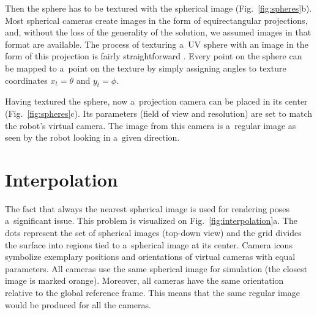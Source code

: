 \documentclass{svproc}
\begin{document}
Then the sphere has to be textured with the spherical image (Fig.~\ref{fig:spheres}b).
Most spherical cameras create images in the form of equirectangular projections, and, without the loss
of the generality of the solution, we assumed images in that format are available.
The process of texturing a~UV sphere with an image in the form of this projection is fairly straightforward \cite{greene1986environment}. 
Every point on the sphere can be mapped to a~point on the texture by simply assigning angles to texture 
coordinates $x_t = \theta$ and $y_t = \phi$.

Having textured the sphere, now a~projection camera can be placed in its center (Fig.~\ref{fig:spheres}c).
Its parameters (field of view and resolution) are set to match the robot's virtual camera.
The image from this camera is a~regular image as seen by the robot looking in a~given direction.

\section{Interpolation}
\label{sec:iterpolate}


The fact that always the nearest spherical image is used for rendering poses a~significant issue.
This problem is visualized on Fig.~\ref{fig:interpolation}a.
The dots represent the set of spherical images (top-down view) and the grid divides the surface into regions tied to a~spherical image at its center.
Camera icons symbolize exemplary positions and orientations of virtual cameras with equal parameters.
All cameras use the same spherical image for simulation (the closest image is marked orange).
Moreover, all cameras have the same orientation relative to the global reference frame.
This means that the same regular image would be produced for all the cameras.
\end{document}
